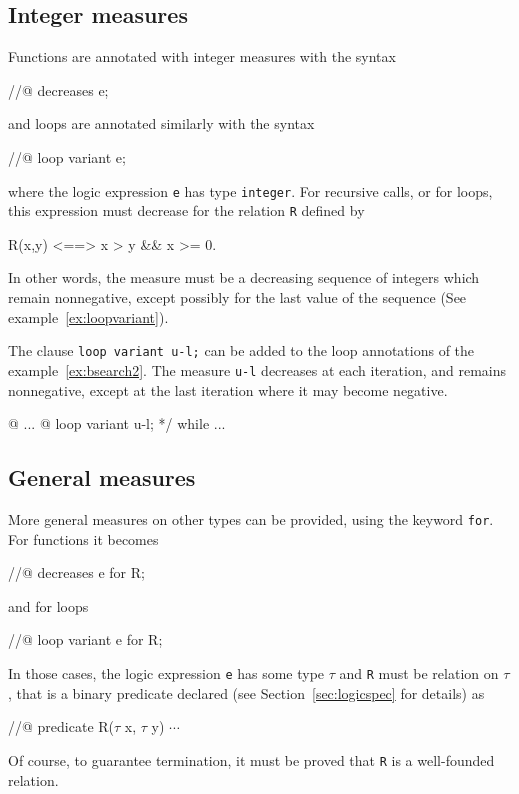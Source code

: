 \subsection{Integer measures}
\label{sec:integermeasures}
Functions are annotated with integer measures with the syntax
\begin{listing-nonumber}
//@ decreases e;
\end{listing-nonumber}
and loops are annotated similarly with the syntax
\begin{listing-nonumber}
//@ loop variant e;
\end{listing-nonumber}
where the logic expression \lstinline|e| has type
\lstinline|integer|.
For recursive calls, or for loops, this expression must decrease for
the
relation \lstinline|R| defined by
\begin{listing-nonumber}
R(x,y) <==> x > y && x >= 0.
\end{listing-nonumber}
In other words, the measure must be a decreasing sequence of integers
which remain nonnegative, except possibly for the last value of the
sequence (See example~\ref{ex:loopvariant}).

\begin{example}
  The clause \lstinline|loop variant u-l;| can be added to the loop 
  annotations of the example~\ref{ex:bsearch2}.
  The measure \lstinline|u-l| decreases
  at each iteration, and remains nonnegative, except at the last
  iteration where it may become negative.
\begin{listing}{16}
  @ ...
  @ loop variant u-l; */
while ...
\end{listing}
\end{example}

\subsection{General measures}
\label{sec:generalmeasures}

More general measures on other types can be provided, using the
keyword \lstinline|for|. For functions it becomes
\begin{listing-nonumber}
//@ decreases e for R;
\end{listing-nonumber}
and for loops
\begin{listing-nonumber}
//@ loop variant e for R;
\end{listing-nonumber}
In those cases, the logic expression \lstinline|e| has some type
$\tau$ and \lstinline|R|
must be relation on $\tau$, that is a binary predicate declared 
(see Section~\ref{sec:logicspec} for details) as
\begin{listing-nonumber}
//@ predicate R($\tau$ x, $\tau$ y) $\cdots$
\end{listing-nonumber}
Of course, to guarantee
termination, it must be proved that \lstinline|R| is a well-founded relation.

